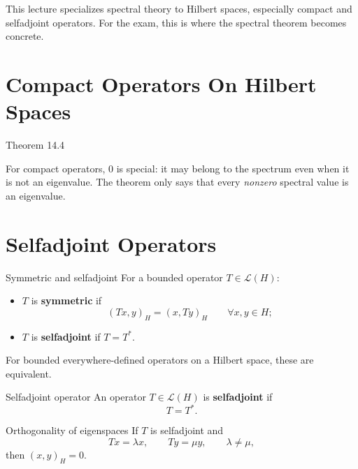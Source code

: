\documentclass[11pt]{article}
\begin{document}

\vspace{0.8em}

\begin{focusbox}
This lecture specializes spectral theory to Hilbert spaces, especially compact and selfadjoint operators. For the exam, this is where the spectral theorem becomes concrete.
\end{focusbox}

\tableofcontents

\section{Compact Operators On Hilbert Spaces}

\begin{thmbox}{Theorem 14.4}
\thmCompactSpectrum
\end{thmbox}

\begin{focusbox}
For compact operators, $0$ is special: it may belong to the spectrum even when it is not an eigenvalue. The theorem only says that every \emph{nonzero} spectral value is an eigenvalue.
\end{focusbox}

\section{Selfadjoint Operators}

\begin{defbox}{Symmetric and selfadjoint}
For a bounded operator $T\in\mathcal L(H)$:
\begin{itemize}
\item $T$ is \textbf{symmetric} if
\[
(Tx,y)_H=(x,Ty)_H \qquad \forall x,y\in H;
\]
\item $T$ is \textbf{selfadjoint} if $T=T^*$.
\end{itemize}
For bounded everywhere-defined operators on a Hilbert space, these are equivalent.
\end{defbox}

\begin{defbox}{Selfadjoint operator}
An operator $T\in\mathcal L(H)$ is \textbf{selfadjoint} if
\[
T=T^*.
\]
\end{defbox}

\begin{thmbox}{Orthogonality of eigenspaces}
If $T$ is selfadjoint and
\[
Tx=\lambda x,
\qquad
Ty=\mu y,
\qquad
\lambda\neq \mu,
\]
then $(x,y)_H=0$.
\end{thmbox}
\end{document}
